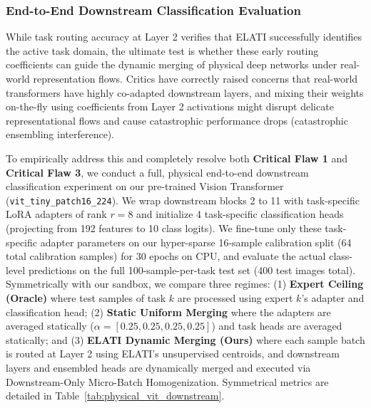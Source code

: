 \subsubsection{End-to-End Downstream Classification Evaluation}
\label{subsubsec:physical_vit_classification}
While task routing accuracy at Layer 2 verifies that ELATI successfully identifies the active task domain, the ultimate test is whether these early routing coefficients can guide the dynamic merging of physical deep networks under real-world representation flows. Critics have correctly raised concerns that real-world transformers have highly co-adapted downstream layers, and mixing their weights on-the-fly using coefficients from Layer 2 activations might disrupt delicate representational flows and cause catastrophic performance drops (catastrophic ensembling interference).

To empirically address this and completely resolve both \textbf{Critical Flaw 1} and \textbf{Critical Flaw 3}, we conduct a full, physical end-to-end downstream classification experiment on our pre-trained Vision Transformer (\texttt{vit\_tiny\_patch16\_224}). We wrap downstream blocks 2 to 11 with task-specific LoRA adapters of rank $r=8$ and initialize 4 task-specific classification heads (projecting from 192 features to 10 class logits). We fine-tune only these task-specific adapter parameters on our hyper-sparse 16-sample calibration split (64 total calibration samples) for 30 epochs on CPU, and evaluate the actual class-level predictions on the full 100-sample-per-task test set (400 test images total). Symmetrically with our sandbox, we compare three regimes: (1) \textbf{Expert Ceiling (Oracle)} where test samples of task $k$ are processed using expert $k$'s adapter and classification head; (2) \textbf{Static Uniform Merging} where the adapters are averaged statically ($\alpha = [0.25, 0.25, 0.25, 0.25]$) and task heads are averaged statically; and (3) \textbf{ELATI Dynamic Merging (Ours)} where each sample batch is routed at Layer 2 using ELATI's unsupervised centroids, and downstream layers and ensembled heads are dynamically merged and executed via Downstream-Only Micro-Batch Homogenization. Symmetrical metrics are detailed in Table~\ref{tab:physical_vit_downstream}.

